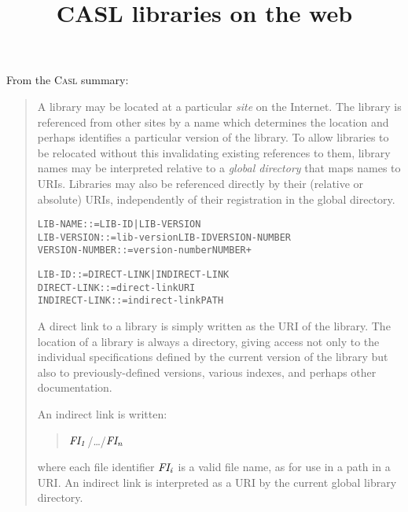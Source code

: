 \documentclass{article}
\renewcommand{\index}[1]{}
\newcommand{\QUERY}[1]
{\marginpar{\raggedright\hspace{0pt}\small #1\\~}}
\newenvironment{Grammar}
 {\small%
  \begin{alltt}}{\end{alltt}\ignorespacesafterend}
\newenvironment{AbstractGrammar}
 {\par\smallskip\samepage\begin{Grammar}}{\end{Grammar}\noindent
 \ignorespacesafterend}
\newenvironment{ConcreteDisplay}
 {\nopagebreak\begin{quote}\casl}{\end{quote}\noindent
 \ignorespacesafterend}
\newcommand{\Metasub}[2]{\mbox{$\it#1_{#2}$}}
\newcommand{\textbothindex}[2]{#1 #2\index{#1!#2}\index{#2!#1}}
\newcommand{\emphindex}[1]{\emph{#1}\index{#1}}
\newcommand{\gramindex}[1]{\texttt{#1}}
\newcommand{\CASL}{\textmd{\textsc{Casl}}\xspace }
\begin{document}
\title{CASL libraries on the web}

\maketitle

From the \CASL summary:

\begin{quote}
A library may be located at a particular \emphindex{site} on the
Internet.  
The library is referenced from other sites by a name which determines
the location and perhaps identifies a particular version of the
library.  To allow libraries to be relocated without this invalidating
existing references to them, library names may be interpreted relative
to a \emph{\textbothindex{global}{directory}} that maps names to URIs.  
\QUERY{CASL/Summary 9, \ldots:\\
URL changed to URI.}
Libraries
may also be referenced directly by their (relative or absolute) URIs,
independently of their registration in the global directory.

\begin{AbstractGrammar}
\gramindex{LIB-NAME}       ::= LIB-ID | LIB-VERSION
\gramindex{LIB-VERSION}    ::= lib-version LIB-ID VERSION-NUMBER
\gramindex{VERSION-NUMBER} ::= version-number NUMBER+
\end{AbstractGrammar}

\begin{AbstractGrammar}
\gramindex{LIB-ID}        ::= DIRECT-LINK | INDIRECT-LINK
\gramindex{DIRECT-LINK}   ::= direct-link URI
\gramindex{INDIRECT-LINK} ::= indirect-link PATH
\end{AbstractGrammar}
A direct link to a library is simply written as the URI of the
library.  The location of a library is always a directory, giving
access not only to the individual specifications defined by the
current version of the library but also to previously-defined
versions, various indexes, and perhaps other documentation.

An indirect link is written:
\begin{ConcreteDisplay}
\Metasub{FI}{1}/\ldots/\Metasub{FI}{n}
\end{ConcreteDisplay}
where each file identifier \Metasub{FI}{i} is a valid file name, as
for use in a path in a URI.  An indirect link is interpreted as a URI
by the current global library directory.



\end{quote}
\end{document}
